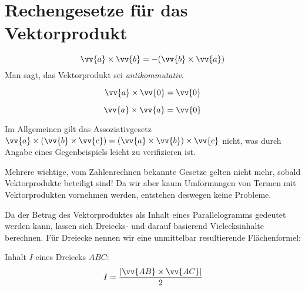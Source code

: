 \section{Rechengesetze für das Vektorprodukt}
\begin{theorem}
\[ \vv{a} \times \vv{b} = - (\vv{b} \times \vv{a} )\]
Man sagt, das Vektorprodukt sei \textit{antikommutativ}.
\end{theorem}

\begin{theorem}
\[ \vv{a} \times \vv{0} = \vv{0} \]
\end{theorem}
\begin{theorem}
\[ \vv{a} \times \vv{a} = \vv{0} \]
\end{theorem}

Im Allgemeinen gilt das Assoziativgesetz $\vv{a} \times (\vv{b} \times \vv{c} )= (\vv{a} \times \vv{b}) \times \vv{c}$ nicht, was durch Angabe eines Gegenbeispiels leicht zu verifizieren ist.

\begin{warning}
Mehrere wichtige, vom Zahlenrechnen bekannte Gesetze gelten nicht mehr, sobald Vektorprodukte beteiligt sind! Da wir aber kaum Umformungen von Termen mit Vektorprodukten vornehmen werden, entstehen deswegen keine Probleme.
\end{warning}
Da der Betrag des Vektorproduktes als Inhalt eines Parallelogramms gedeutet werden kann, lassen sich Dreiecks- und darauf basierend Vielecksinhalte berechnen. Für Dreiecke nennen wir eine unmittelbar resultierende Flächenformel:
\begin{theorem}[Flächenformel]
Inhalt $I$ eines Dreiecks $ABC$:
\[ I = \frac{|\vv{AB} \times \vv{AC}|}{2} \]
\end{theorem}


